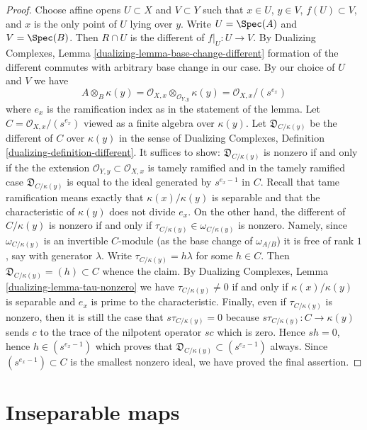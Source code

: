 \begin{proof}
\medskip\noindent
Choose affine opens $U \subset X$ and $V \subset Y$
such that $x \in U$, $y \in V$, $f(U) \subset V$, and $x$ is the only
point of $U$ lying over $y$. Write $U = \Spec(A)$ and $V = \Spec(B)$.
Then $R \cap U$ is the different of $f|_U : U \to V$.
By Dualizing Complexes, Lemma \ref{dualizing-lemma-base-change-different}
formation of the different commutes with arbitrary base change
in our case. By our choice of $U$ and $V$ we have
$$
A \otimes_B \kappa(y) =
\mathcal{O}_{X, x} \otimes_{\mathcal{O}_{Y, y}} \kappa(y) =
\mathcal{O}_{X, x}/(s^{e_x})
$$
where $e_x$ is the ramification index as in the statement of the lemma.
Let $C = \mathcal{O}_{X, x}/(s^{e_x})$ viewed as a finite algebra
over $\kappa(y)$. Let $\mathfrak{D}_{C/\kappa(y)}$ be the different
of $C$ over $\kappa(y)$ in the sense of
Dualizing Complexes, Definition \ref{dualizing-definition-different}.
It suffices to show: $\mathfrak{D}_{C/\kappa(y)}$
is nonzero if and only if the the extension
$\mathcal{O}_{Y, y} \subset \mathcal{O}_{X, x}$ is tamely ramified
and in the tamely ramified case $\mathfrak{D}_{C/\kappa(y)}$
is equal to the ideal generated by $s^{e_x - 1}$ in $C$.
Recall that tame ramification means exactly that $\kappa(x)/\kappa(y)$
is separable and that the characteristic of $\kappa(y)$ does not
divide $e_x$. On the other hand, the different of $C/\kappa(y)$ is nonzero
if and only if $\tau_{C/\kappa(y)} \in \omega_{C/\kappa(y)}$ is nonzero.
Namely, since $\omega_{C/\kappa(y)}$ is an invertible $C$-module
(as the base change of $\omega_{A/B}$)
it is free of rank $1$, say with generator $\lambda$. Write
$\tau_{C/\kappa(y)} = h\lambda$ for some $h \in C$. Then
$\mathfrak{D}_{C/\kappa(y)} = (h) \subset C$ whence the claim.
By Dualizing Complexes, Lemma \ref{dualizing-lemma-tau-nonzero}
we have $\tau_{C/\kappa(y)} \not = 0$
if and only if $\kappa(x)/\kappa(y)$
is separable and $e_x$ is prime to the characteristic.
Finally, even if $\tau_{C/\kappa(y)}$ is nonzero, then
it is still the case that $s \tau_{C/\kappa(y)} = 0$
because $s\tau_{C/\kappa(y)} : C \to \kappa(y)$
sends $c$ to the trace of the nilpotent operator $sc$ which is zero.
Hence $sh = 0$, hence $h \in (s^{e_x - 1})$ which proves
that $\mathfrak{D}_{C/\kappa(y)} \subset (s^{e_x - 1})$ always.
Since $(s^{e_x - 1}) \subset C$ is the smallest nonzero ideal,
we have proved the final assertion.
\end{proof}






\section{Inseparable maps}
\label{section-inseparable}


